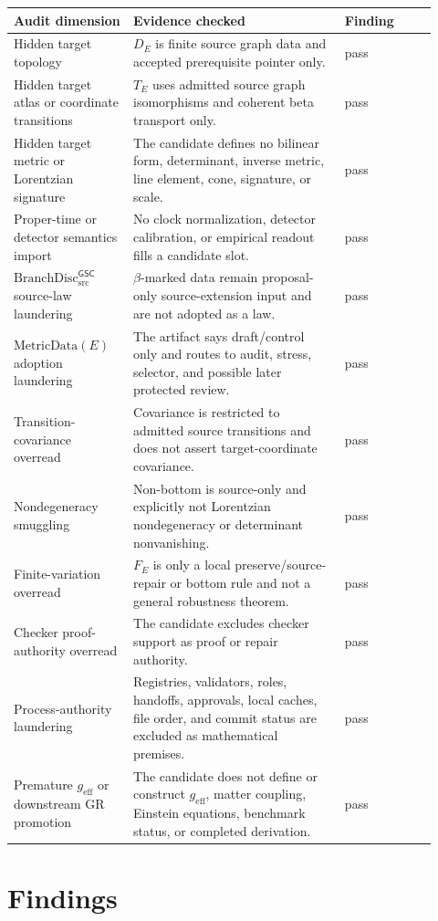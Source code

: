 \documentclass[11pt]{article}
\newcommand{\BranchDisc}{\mathrm{BranchDisc}_{\mathrm{src}}^{\mathsf{GSC}}}
\newcommand{\geff}{g_{\mathrm{eff}}}
\begin{document}
\begin{longtable}{p{0.26\linewidth}p{0.46\linewidth}p{0.20\linewidth}}
\toprule
Audit dimension & Evidence checked & Finding \\
\midrule
Hidden target topology & \(D_E\) is finite source graph data and accepted
prerequisite pointer only. & pass \\
Hidden target atlas or coordinate transitions & \(T_E\) uses admitted source
graph isomorphisms and coherent beta transport only. & pass \\
Hidden target metric or Lorentzian signature & The candidate defines no
bilinear form, determinant, inverse metric, line element, cone, signature, or
scale. & pass \\
Proper-time or detector semantics import & No clock normalization, detector
calibration, or empirical readout fills a candidate slot. & pass \\
\(\BranchDisc\) source-law laundering & \(\beta\)-marked data remain
proposal-only source-extension input and are not adopted as a law. & pass \\
\(\mathrm{MetricData}(E)\) adoption laundering & The artifact says
draft/control only and routes to audit, stress, selector, and possible later
protected review. & pass \\
Transition-covariance overread & Covariance is restricted to admitted source
transitions and does not assert target-coordinate covariance. & pass \\
Nondegeneracy smuggling & Non-bottom is source-only and explicitly not
Lorentzian nondegeneracy or determinant nonvanishing. & pass \\
Finite-variation overread & \(F_E\) is only a local preserve/source-repair or
bottom rule and not a general robustness theorem. & pass \\
Checker proof-authority overread & The candidate excludes checker support as
proof or repair authority. & pass \\
Process-authority laundering & Registries, validators, roles, handoffs,
approvals, local caches, file order, and commit status are excluded as
mathematical premises. & pass \\
Premature \(\geff\) or downstream GR promotion & The candidate does not define
or construct \(\geff\), matter coupling, Einstein equations, benchmark status,
or completed derivation. & pass \\
\bottomrule
\end{longtable}

\section{Findings}
\end{document}
